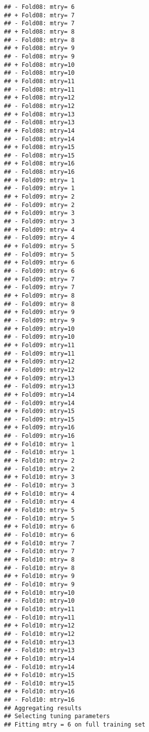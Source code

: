\documentclass[]{article}
\newenvironment{Shaded}{\begin{snugshade}}{\end{snugshade}}
\newcommand{\CommentTok}[1]{\textcolor[rgb]{0.56,0.35,0.01}{\textit{#1}}}
\newcommand{\NormalTok}[1]{#1}
\newcommand{\OperatorTok}[1]{\textcolor[rgb]{0.81,0.36,0.00}{\textbf{#1}}}
\begin{document}
\begin{verbatim}
## - Fold08: mtry= 6 
## + Fold08: mtry= 7 
## - Fold08: mtry= 7 
## + Fold08: mtry= 8 
## - Fold08: mtry= 8 
## + Fold08: mtry= 9 
## - Fold08: mtry= 9 
## + Fold08: mtry=10 
## - Fold08: mtry=10 
## + Fold08: mtry=11 
## - Fold08: mtry=11 
## + Fold08: mtry=12 
## - Fold08: mtry=12 
## + Fold08: mtry=13 
## - Fold08: mtry=13 
## + Fold08: mtry=14 
## - Fold08: mtry=14 
## + Fold08: mtry=15 
## - Fold08: mtry=15 
## + Fold08: mtry=16 
## - Fold08: mtry=16 
## + Fold09: mtry= 1 
## - Fold09: mtry= 1 
## + Fold09: mtry= 2 
## - Fold09: mtry= 2 
## + Fold09: mtry= 3 
## - Fold09: mtry= 3 
## + Fold09: mtry= 4 
## - Fold09: mtry= 4 
## + Fold09: mtry= 5 
## - Fold09: mtry= 5 
## + Fold09: mtry= 6 
## - Fold09: mtry= 6 
## + Fold09: mtry= 7 
## - Fold09: mtry= 7 
## + Fold09: mtry= 8 
## - Fold09: mtry= 8 
## + Fold09: mtry= 9 
## - Fold09: mtry= 9 
## + Fold09: mtry=10 
## - Fold09: mtry=10 
## + Fold09: mtry=11 
## - Fold09: mtry=11 
## + Fold09: mtry=12 
## - Fold09: mtry=12 
## + Fold09: mtry=13 
## - Fold09: mtry=13 
## + Fold09: mtry=14 
## - Fold09: mtry=14 
## + Fold09: mtry=15 
## - Fold09: mtry=15 
## + Fold09: mtry=16 
## - Fold09: mtry=16 
## + Fold10: mtry= 1 
## - Fold10: mtry= 1 
## + Fold10: mtry= 2 
## - Fold10: mtry= 2 
## + Fold10: mtry= 3 
## - Fold10: mtry= 3 
## + Fold10: mtry= 4 
## - Fold10: mtry= 4 
## + Fold10: mtry= 5 
## - Fold10: mtry= 5 
## + Fold10: mtry= 6 
## - Fold10: mtry= 6 
## + Fold10: mtry= 7 
## - Fold10: mtry= 7 
## + Fold10: mtry= 8 
## - Fold10: mtry= 8 
## + Fold10: mtry= 9 
## - Fold10: mtry= 9 
## + Fold10: mtry=10 
## - Fold10: mtry=10 
## + Fold10: mtry=11 
## - Fold10: mtry=11 
## + Fold10: mtry=12 
## - Fold10: mtry=12 
## + Fold10: mtry=13 
## - Fold10: mtry=13 
## + Fold10: mtry=14 
## - Fold10: mtry=14 
## + Fold10: mtry=15 
## - Fold10: mtry=15 
## + Fold10: mtry=16 
## - Fold10: mtry=16 
## Aggregating results
## Selecting tuning parameters
## Fitting mtry = 6 on full training set
\end{verbatim}

\begin{Shaded}
\end{Shaded}
\end{document}
